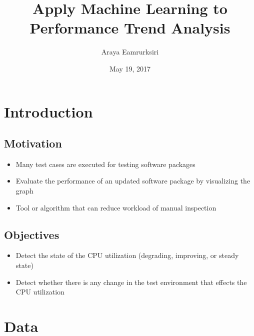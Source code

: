 \documentclass{beamer}
\title[Master Thesis]{Apply Machine Learning to Performance Trend Analysis} %
\author{Araya Eamrurksiri}
\institute[LiU] %
{
Linkoping university \\ %
\medskip
\textit{} %
}
\date{May 19, 2017}
\begin{document}
\begin{frame}
\titlepage %
\end{frame}



\section{Introduction} 
\subsection{Motivation}
\begin{frame}

\begin{itemize}
	\item Many test cases are executed for testing software packages 
	\item Evaluate the performance of an updated software package by visualizing the graph 
	\item Tool or algorithm that can reduce workload of manual inspection
\end{itemize}	

\end{frame}
\subsection{Objectives}
\begin{frame}
\begin{itemize}
	\item Detect the state of the CPU utilization (degrading, improving, or steady state)
	\item Detect whether there is any change in the test environment that effects the CPU utilization
\end{itemize}
\end{frame}

\section{Data}
\end{document}
